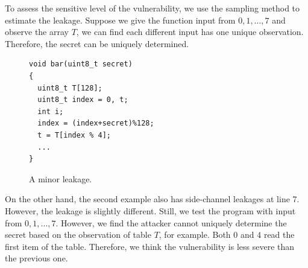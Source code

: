 To assess the sensitive level of the vulnerability, we use the sampling method to estimate the leakage. Suppose we give the function input from $0, 1, \dots, 7$ and observe the array $T$, we can find each different input has one unique observation. Therefore, the secret can be uniquely determined.

\begin{figure}[h]
  \begin{minipage}{0.60\linewidth}
    \begin{lstlisting}[xleftmargin=.15\textwidth,xrightmargin=.30\textwidth]
void bar(uint8_t secret)
{
  uint8_t T[128];
  uint8_t index = 0, t;
  int i;
  index = (index+secret)%128;
  t = T[index % 4];
  ...
}
\end{lstlisting}
  \end{minipage}
  \hfill
  \begin{minipage}{0.4\linewidth}
  \end{minipage}
  \caption{A minor leakage. }\label{chapter5:fig:example2}
\end{figure}
On the other hand, the second example also has side-channel leakages at line 7. However, the leakage is slightly different. Still, we test the program with input from $0, 1, \dots, 7$. However, we find the attacker cannot uniquely determine the secret based on the observation of table $T$, for example. Both $0$ and $4$ read the first item of the table. Therefore, we think the vulnerability is less severe than the previous one.

